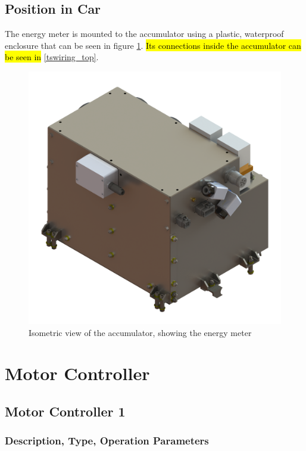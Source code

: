 \documentclass{article}
\DeclareRobustCommand{\hlr}[1]{{\sethlcolor{red}\hl{#1}}}
\begin{document}
    \subsection{Position in Car}

        The energy meter is mounted to the accumulator using a plastic, waterproof enclosure that can be seen in figure \ref{accumiso}. \hlr{Its connections inside the accumulator can be seen in} \ref{tswiring_top}.

        \begin{figure}[H]
            \centering
            \includegraphics[width = 0.7 \textwidth]{accumulator_isoview}
            \caption{Isometric view of the accumulator, showing the energy meter}
            \label{accumiso}
        \end{figure}

\newpage

\section{Motor Controller} \label{MCs}

    \subsection{Motor Controller 1} \label{MC1}

        \subsubsection{Description, Type, Operation Parameters}

\end{document}
